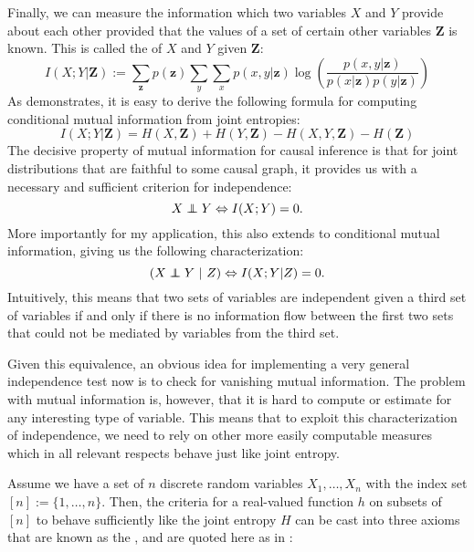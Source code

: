 Finally, we can measure the information which two variables $X$ and $Y$ provide about each other provided that the values of a set of certain other variables $\mathbf{Z}$ is known. This is called the \textit{} of $X$ and $Y$ given $\mathbf{Z}$:
 \begin{equation*}
  I(X;Y|\mathbf{Z}) := \sum_{\mathbf{z}} p(\mathbf{z}) \sum_{y} \sum_{x} p(x,y|\mathbf{z}) \log \left( \frac{p(x,y|\mathbf{z})}{p(x|\mathbf{z})p(y|\mathbf{z})} \right) 
 \end{equation*}
As \cite{yeung2008} demonstrates, it is easy to derive the following formula for computing conditional mutual information from joint entropies:
\begin{equation*}
 I(X;Y|\mathbf{Z}) = H(X,\mathbf{Z}) + H(Y,\mathbf{Z}) - H(X,Y,\mathbf{Z}) - H(\mathbf{Z})
\end{equation*}
The decisive property of mutual information for causal inference is that for joint distributions that are faithful to some causal graph, it provides us with a necessary and sufficient criterion for independence:
\begin{equation*}
 X \indep Y \Leftrightarrow I(X;Y) = 0.
\end{equation*}
More importantly for my application, this also extends to conditional mutual information, giving us the following characterization:
\begin{equation*}
 (X \indep Y\ |\ Z) \Leftrightarrow I(X;Y|Z) = 0.
\end{equation*}
Intuitively, this means that two sets of variables are independent given a third set of variables if and only if there is no information flow between the first two sets that could not be mediated by variables from the third set.

Given this equivalence, an obvious idea for implementing a very general independence test now is to check for vanishing mutual information. The problem with mutual information is, however, that it is hard to compute or estimate for any interesting type of variable. This means that to exploit this characterization of independence, we need to rely on other more easily computable measures which in all relevant respects behave just like joint entropy.

Assume we have a set of $n$ discrete random variables $X_1,\dots,X_n$ with the index set $[n] := \{1,\dots,n\}$. Then, the criteria for a real-valued function $h$ on subsets of $[n]$ to behave sufficiently like the joint entropy $H$ can be cast into three axioms that are known as the \textit{}, and are quoted here as in \cite{chaves_ea_2014}:

